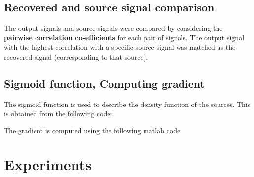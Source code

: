 \documentclass[11pt]{article}
\begin{document}
\subsection{Recovered and source signal comparison}
The output signals and source signals were compared by considering the \textbf{pairwise correlation co-efficients} for each pair of signals. 
The output signal with the highest correlation with a specific source signal was matched as the recovered signal (corresponding to that source).

\subsection{Sigmoid function, Computing gradient}

The sigmoid function is used to describe the density function of the sources. This is obtained from the following code:


The gradient is computed using the following matlab code:


\section{Experiments}
\end{document}
